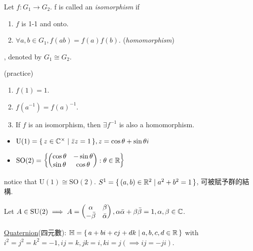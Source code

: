 \begin{definition}
  Let $f: G_1 \to G_2$. f is called an {\it isomorphism} if
  \begin{enumerate}
    \item $f$ is 1-1 and onto.
    \item $\forall a, b \in G_1, f(ab) = f(a)f(b)$. ({\it homomorphism})
  \end{enumerate}
  , denoted by $G_1 \cong G_2$.
\end{definition}

\begin{remark} (practice)
  \begin{enumerate}
    \item $f(1) = 1$.
    \item $f(a^{-1}) = f(a)^{-1}$.
    \item If $f$ is an isomorphism, then $\exists f^{-1}$ is also a
      homomorphism.
  \end{enumerate}
\end{remark}

\begin{example} \mbox{}
  \begin{itemize}
    \item $\text{U}(1) = \{\, z \in \mathbb{C}^\times \mid \bar{z}z = 1 \,\},
      z = \cos \theta + \sin \theta i$
    \item $\text{SO}(2) = \left\{ \begin{pmatrix}
        \cos \theta & - \sin\theta \\
        \sin \theta & \cos\theta
      \end{pmatrix} : \theta \in \mathbb{R} \right\}$
  \end{itemize}
  notice that $\text{U}(1) \cong \text{SO}(2)$.
  $S^1 = \{\, (a, b) \in \mathbb{R}^2 \mid a^2 + b^2 = 1 \,\}$, 可被賦予群的結構.
\end{example}

\begin{example}
  Let $A \in \text{SU}(2) \implies A = \begin{pmatrix}
    \alpha & \beta \\
    -\bar{\beta} & \bar{\alpha} \end{pmatrix},
    \alpha\bar{\alpha} + \beta\bar{\beta} = 1, \alpha, \beta \in \mathbb{C}$.
\end{example}

\underline{Quaternion}(四元數): $\mathbb{H} = \{\,
  a + bi + cj + dk \mid a, b, c, d \in \mathbb{R} \,\}$ with $i^2 = j^2 = k^2 = -1,
  ij = k, jk = i, ki = j (\implies ij = -ji)$.


